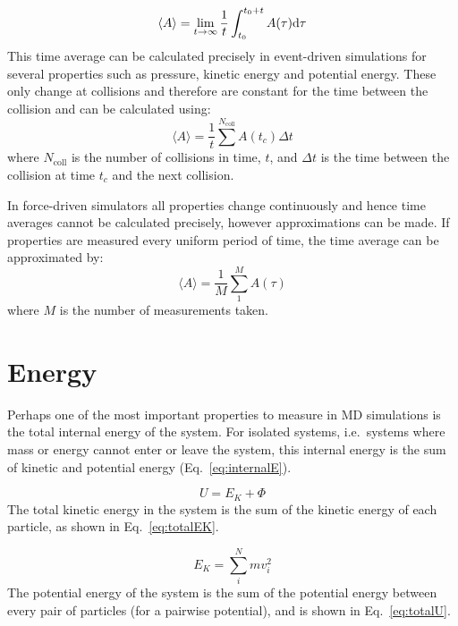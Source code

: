 \documentclass[12pt]{UoAthesis} \usepackage{booktabs}
\begin{document}
\begin{equation}
  \label{eq:TAdef}
  \langle A \rangle = \lim_{t \to \infty} \frac{1}{t}  \int^{t_0+t}_{t_0}A(\tau) {\rm d}\tau
\end{equation}
This time average can be calculated precisely in event-driven
simulations for several properties such as pressure, kinetic energy
and potential energy.  These only change at collisions and therefore
are constant for the time between the collision and can be calculated
using:
\begin{equation}
  \label{eq:TASum}
  \langle A \rangle = \frac{1}{t}\sum^{N_{\text{coll}}}A(t_c)\Delta t
\end{equation}
where $N_{\text{coll}}$ is the number of collisions in time, $t$, and
$\Delta t$ is the time between the collision at time $t_c$ and the
next collision.

In force-driven simulators all properties change continuously and
hence time averages cannot be calculated precisely, however
approximations can be made. If properties are measured every uniform
period of time, the time average can be approximated by:
\begin{equation}
  \label{eq:TAforcedriven}
  \langle A \rangle = \frac{1}{M} \sum^{M}_{1}A(\tau)
\end{equation}
where $M$ is the number of measurements taken.
\section{Energy \label{sec:Energy}}
Perhaps one of the most important properties to measure in MD
simulations is the total internal energy of the system.  For isolated
systems, i.e.\ systems where mass or energy cannot enter or leave the
system, this internal energy is the sum of kinetic and potential
energy (Eq.~\eqref{eq:internalE}).

\begin{equation}
  U = E_K + \Phi \label{eq:internalE}
\end{equation}
The total kinetic energy in the system is the sum of the kinetic
energy of each particle, as shown in Eq.~\eqref{eq:totalEK}.

\begin{equation}
  \label{eq:totalEK}
  E_K = \sum_i^N mv_i^2
\end{equation}
The potential energy of the system is the sum of the potential energy
between every pair of particles (for a pairwise potential), and is
shown in Eq.~\eqref{eq:totalU}.
\end{document}
